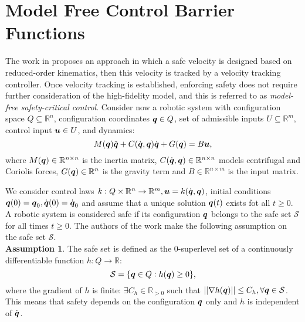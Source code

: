 \section{Model Free Control Barrier Functions}
The work in \cite{mf_cbf} proposes an approach in which a safe velocity is designed based on reduced-order kinematics, then this velocity is tracked by a velocity tracking controller. Once velocity tracking is established, enforcing safety does not require further consideration of the high-fidelity model, and this is referred to as \textit{model-free safety-critical control}.
Consider now a robotic system with configuration space $Q \subseteq \mathbb{R}^n$, configuration coordinates ${\boldsymbol{q}} \in Q$, set of admissible inputs $U\subseteq \mathbb{R}^m$, control input $\boldsymbol{u} \in U$, and dynamics:
\begin{equation} \label{eq:dynamic model}
    M({\boldsymbol{q}})\ddot{{\boldsymbol{q}}}+C(\dot{{\boldsymbol{q}}},{\boldsymbol{q}})\dot{{\boldsymbol{q}}}+G({\boldsymbol{q}})=B\boldsymbol{u},
\end{equation}
where $M({\boldsymbol{q}})\in\mathbb{R}^{n \times n}$ is the inertia matrix, $C(\dot{{\boldsymbol{q}}},{\boldsymbol{q}})\in\mathbb{R}^{n \times n}$ models centrifugal and Coriolis forces, $G({\boldsymbol{q}})\in\mathbb{R}^{n}$ is the gravity term and $B\in\mathbb{R}^{n \times m}$ is the input matrix.

We consider control laws $ k:Q\times \mathbb{R}^n \rightarrow \mathbb{R}^m, \boldsymbol{u}=k(\dot{{\boldsymbol{q}}},{\boldsymbol{q}})$, initial conditions ${\boldsymbol{q}}(0) = {\boldsymbol{q}}_0, \dot{{\boldsymbol{q}}}(0)=\dot{{\boldsymbol{q}}}_0$ and assume that a unique solution ${\boldsymbol{q}}(t)$ exists fot all $t \geq 0$. A robotic system is considered safe if its configuration ${\boldsymbol{q}}$ belongs to the safe set $\mathcal{S}$ for all times $t\geq 0$. The authors of the work \cite{mf_cbf} make the following assumption on the safe set $\mathcal{S}$.\\
\textbf{Assumption 1}. The safe set is defined as the 0-superlevel set of a continuously differentiable function $h: Q \rightarrow \mathbb{R}$:
\begin{equation} \label{eq:safe set}
    \mathcal{S} = \{{\boldsymbol{q}} \in Q: h({\boldsymbol{q}})\geq 0 \},
\end{equation}
where the gradient of $h$ is finite: $\exists C_h \in \mathbb{R}_{>0}$ such that $|| \nabla h({\boldsymbol{q}})|| \leq C_h, \forall {\boldsymbol{q}} \in \mathcal{S}$. This means that safety depends on the configuration ${\boldsymbol{q}}$ only and $h$ is independent of $\dot{{\boldsymbol{q}}}$.


